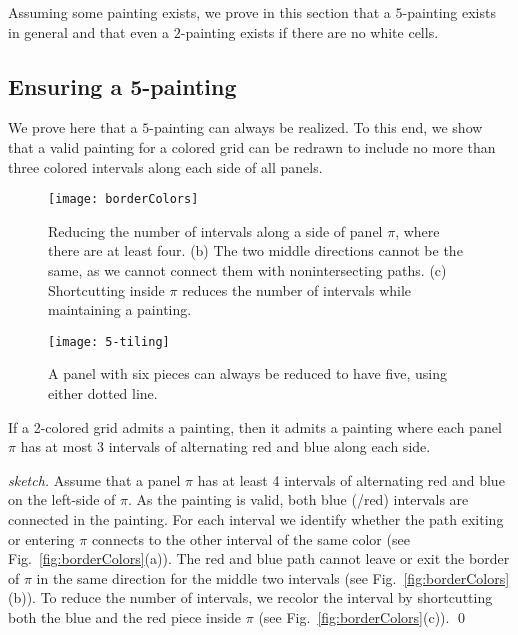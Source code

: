 \documentclass[runningheads]{llncs}
\begin{document}
Assuming some painting exists, we prove in this section that a $5$-painting exists in general and that even a $2$-painting exists if there are no white cells.

\subsection{Ensuring a 5-painting}
\label{ssec:semiregular}

We prove here that a $5$-painting can always be realized.
To this end, we show that a valid painting for a colored grid
 can be redrawn to include no more than three colored intervals along each side of all panels.

\begin{figure}[b]
	\begin{minipage}[t]{.75\textwidth}
		\centering
        \texttt{[image: borderColors]}
        \caption{Reducing the number of intervals along a side of panel $\pi$, where there are at least four. (b) The two middle directions cannot be the same, as we cannot connect them with nonintersecting paths. (c) Shortcutting inside $\pi$ reduces the number of intervals while maintaining a painting. }
        \label{fig:borderColors}
	\end{minipage}
	\hfill
	\begin{minipage}[t]{.22\textwidth}
	\centering
	\texttt{[image: 5-tiling]}
	\caption{A panel with six pieces can always be reduced to have five, using either dotted line.}
	\label{fig:5-painting}
	\end{minipage}
	
\end{figure}

\begin{lemma}\label{lem:threeBorders}
If a 2-colored grid admits a painting, then it admits a painting where each panel $\pi$ has at most 3 intervals of alternating red and blue along each side.
\end{lemma}
\begin{proof}[sketch]
Assume that a panel $\pi$ has at least 4 intervals of alternating red and blue on the left-side of $\pi$.
As the painting is valid, both blue (/red) intervals are connected in the painting.
For each interval we identify whether the path exiting or entering $\pi$ connects to the other interval of the same color (see Fig.~\ref{fig:borderColors}(a)).
The red and blue path cannot leave or exit the border of $\pi$ in the same direction for the middle two intervals (see Fig.~\ref{fig:borderColors}(b)).
To reduce the number of intervals, we recolor the interval by shortcutting both the blue and the red piece inside $\pi$ (see Fig.~\ref{fig:borderColors}(c)).
\hfill\qed
\end{proof}
\end{document}
